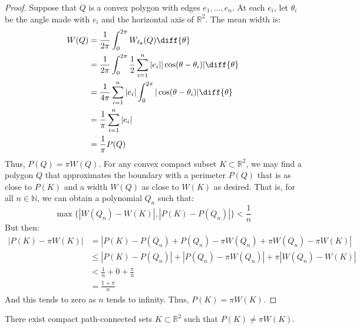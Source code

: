         \begin{proof}
        Suppose that $Q$ is a convex polygon with edges
        $e_1,\hdots, e_n$. At each $e_i$, let $\theta_i$ be the
        angle made with $e_i$ and the horizontal axis of $\mathbb{R}^2$.
        The mean width is:
        \begin{subequations}
            \begin{align}
                W(Q)&=\frac{1}{2\pi}\int_{0}^{2\pi}
                    W_{\ell_\theta}(Q)\diff{\theta}\\
                &=\frac{1}{2\pi}\int_{0}^{2\pi}\frac{1}{2}
                    \sum_{i=1}^{n} |e_i|
                    |\cos(\theta-\theta_i)|\diff{\theta}\\
                &=\frac{1}{4\pi}\sum_{i=1}^{n}|e_{i}|\int_{0}^{2\pi}
                    |\cos(\theta-\theta_i)|\diff{\theta}\\
                &=\frac{1}{\pi}\sum_{i=1}^{n}|e_i|\\
                &=\frac{1}{\pi}P(Q)
            \end{align}
        \end{subequations}
        Thus, $P(Q) = \pi W(Q)$. For any convex compact
        subset $K\subset \mathbb{R}^2$, we may find a polygon $Q$
        that approximates the boundary with a perimeter $P(Q)$
        that is as close to $P(K)$ and a width $W(Q)$ as close
        to $W(K)$ as desired. That is, for all $n\in \mathbb{N}$,
        we can obtain a polynomial $Q_{n}$ such that:
        \begin{equation}
            \max\{|W(Q_n)-W(K)|,|P(K)-P(Q_n)|\}<\frac{1}{n}
        \end{equation}
        But then:
        \begin{subequations}
            \begin{align}
                |P(K)-\pi W(K)|&=
                |P(K)-P(Q_n)+P(Q_n)-\pi{W}(Q_n)+\pi{W}(Q_n)-\pi{W}(K)|\\
                &\leq|P(K)-P(Q_n)|+|P(Q_n)-\pi{W}(Q_n)|+\pi|W(Q_n)-W(K)|\\
                &<\frac{1}{n}+0+\frac{\pi}{n}\\
                &=\frac{1+\pi}{n}
            \end{align}
        \end{subequations}
        And this tends to zero as $n$ tends to infinity.
        Thus, $P(K)=\pi{W}(K)$.
        \end{proof}
        \begin{theorem}
        There exist compact path-connected sets $K\subset \mathbb{R}^2$ such that $P(K) \ne \pi W(K)$.
        \end{theorem}
